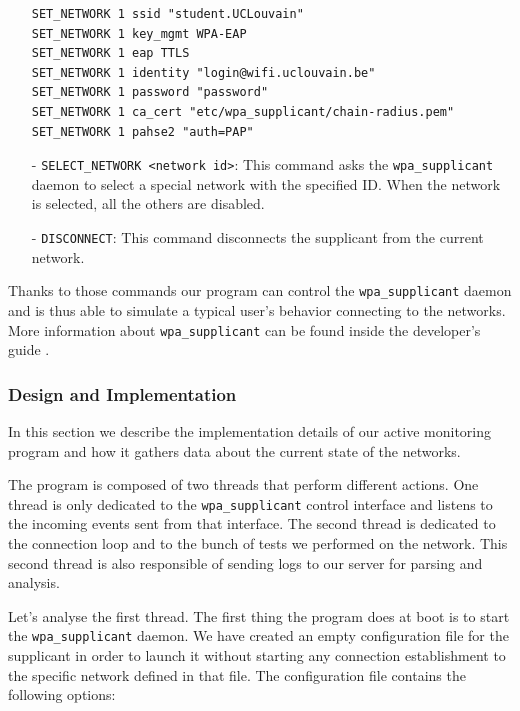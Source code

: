 \begin{itemize}
\begin{lstlisting}[frame=single,breaklines=true,caption={Configuration of the \texttt{student.UCLouvain} network}]
SET_NETWORK 1 ssid "student.UCLouvain"
SET_NETWORK 1 key_mgmt WPA-EAP
SET_NETWORK 1 eap TTLS
SET_NETWORK 1 identity "login@wifi.uclouvain.be"
SET_NETWORK 1 password "password"
SET_NETWORK 1 ca_cert "etc/wpa_supplicant/chain-radius.pem"
SET_NETWORK 1 pahse2 "auth=PAP"
\end{lstlisting}

	\item[-] \texttt{SELECT\_NETWORK <network id>}: This command asks the \texttt{wpa\_supplicant} daemon to select a special network with the specified ID. When the network is selected, all the others are disabled.

	\item[-] \texttt{DISCONNECT}: This command disconnects the supplicant from the current network.
\end{itemize}

Thanks to those commands our program can control the \texttt{wpa\_supplicant} daemon and is thus able to simulate a typical user's behavior connecting to the networks. More information about \texttt{wpa\_supplicant} can be found inside the developer's guide \cite{wpa-supplicant-devel}.


\subsubsection{Design and Implementation}
In this section we describe the implementation details of our active monitoring program and how it gathers data about the current state of the networks.

The program is composed of two threads that perform different actions. One thread is only dedicated to the \texttt{wpa\_supplicant} control interface and listens to the incoming events sent from that interface. The second thread is dedicated to the connection loop and to the bunch of tests we performed on the network. This second thread is also responsible of sending logs to our server for parsing and analysis.

Let's analyse the first thread. The first thing the program does at boot is to start the \texttt{wpa\_supplicant} daemon. We have created an empty configuration file for the supplicant in order to launch it without starting any connection establishment to the specific network defined in that file. The configuration file contains the following options:\\

